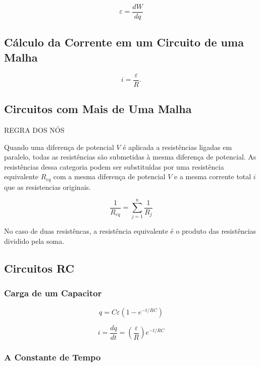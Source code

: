 \begin{equation}\label{18.33}
    \varepsilon = \dfrac{dW}{dq}
\end{equation}

\subsection{Cálculo da Corrente em um Circuito de uma Malha}

\begin{equation}
    i=\dfrac{\varepsilon}{R}.
\end{equation}

\subsection{Circuitos com Mais de Uma Malha}

REGRA DOS NÓS

Quando uma diferença de potencial $V$ é aplicada a resistências ligadas em paralelo, todas as resistências são submetidas à mesma diferença de potencial. As resistências dessa categoria podem ser substituídas por uma resistência equivalente $R_{eq}$ com a mesma diferença de potencial $V$ e a mesma corrente total $i$ que as resistencias originais.

\begin{equation}
\dfrac{1}{R_{eq}}=\sum_{j=1}^n\dfrac{1}{R_j}
\end{equation}

No caso de duas resistêncas, a resistência equivalente é o produto das resistências dividido pela soma.

\subsection{Circuitos RC}

\subsubsection{Carga de um Capacitor}

\begin{equation}
    q=C\varepsilon(1-e^{-t/RC})
\end{equation}

\begin{equation}
    i=\dfrac{dq}{dt}=\left( \dfrac{\varepsilon}{R} \right)e^{-t/RC}
\end{equation}

\subsubsection{A Constante de Tempo}

